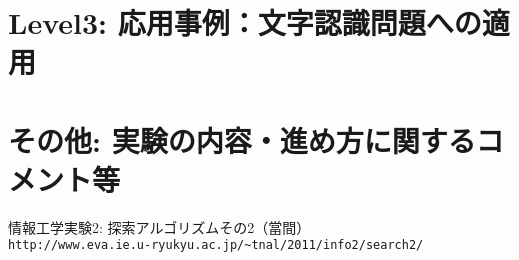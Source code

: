 \documentclass[10pt]{jarticle}
\begin{document}
\section{Level3: 応用事例：文字認識問題への適用}





\newpage
\section{その他: 実験の内容・進め方に関するコメント等}


\vspace{+1.0cm}
\begin{thebibliography}{99}
情報工学実験2: 探索アルゴリズムその2（當間）\\
\verb|http://www.eva.ie.u-ryukyu.ac.jp/~tnal/2011/info2/search2/|
\end{thebibliography}
\end{document}
